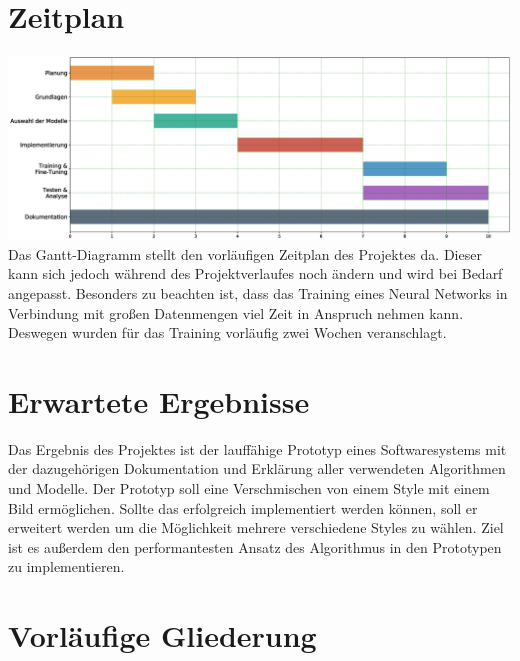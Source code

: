 \section{Zeitplan}
\includegraphics[width=1.00\textwidth]{resources/gantt.eps}
Das Gantt-Diagramm stellt den vorläufigen Zeitplan des Projektes da.
Dieser kann sich jedoch während des Projektverlaufes noch ändern und wird bei Bedarf angepasst.
Besonders zu beachten ist, dass das Training eines Neural Networks in Verbindung mit großen Datenmengen viel Zeit in Anspruch nehmen kann.
Deswegen wurden für das Training vorläufig zwei Wochen veranschlagt.

\section{Erwartete Ergebnisse}
Das Ergebnis des Projektes ist der lauffähige Prototyp eines Softwaresystems mit der dazugehörigen Dokumentation und Erklärung
aller verwendeten Algorithmen und Modelle. Der Prototyp soll eine Verschmischen von einem Style mit einem Bild ermöglichen. 
Sollte das erfolgreich implementiert werden können, soll er erweitert werden um die Möglichkeit mehrere verschiedene Styles zu wählen.
Ziel ist es außerdem den performantesten Ansatz des Algorithmus in den Prototypen zu implementieren.

\pagebreak

\section{Vorläufige Gliederung}

